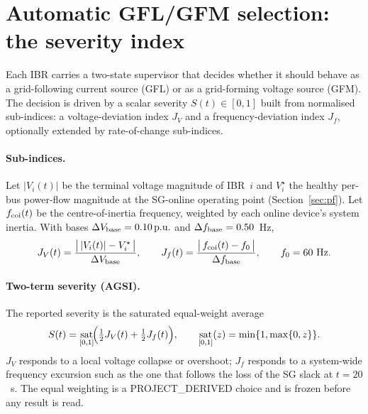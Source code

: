 \documentclass[12pt,a4paper]{article}
\DeclareMathOperator{\sat}{sat}
\newcommand{\pu}{\ifmmode\,\mathrm{p.u.}\else\ p.u.\fi}
\begin{document}
\section{Automatic GFL/GFM selection: the severity index}\label{sec:sev}

Each IBR carries a two-state supervisor that decides whether it should behave
as a grid-following current source (GFL) or as a grid-forming voltage source
(GFM).  The decision is driven by a scalar severity $S(t)\in[0,1]$ built from
normalised sub-indices: a voltage-deviation index $J_V$ and a
frequency-deviation index $J_f$, optionally extended by rate-of-change
sub-indices.

\paragraph{Sub-indices.}
Let $|V_i(t)|$ be the terminal voltage magnitude of IBR~$i$ and $V_i^{\star}$
the healthy per-bus power-flow magnitude at the SG-online operating point
(Section~\ref{sec:pf}).  Let $f_{\rm coi}(t)$ be the centre-of-inertia
frequency, weighted by each online device's system inertia.  With bases
$\Delta V_{\rm base}=0.10\pu$ and $\Delta f_{\rm base}=0.50$~Hz,
\begin{equation}
  J_V(t)=\frac{\bigl|\,|V_i(t)|-V_i^{\star}\,\bigr|}{\Delta V_{\rm base}},
  \qquad
  J_f(t)=\frac{\bigl|\,f_{\rm coi}(t)-f_0\,\bigr|}{\Delta f_{\rm base}},
  \qquad f_0=60~\mathrm{Hz}.
  \label{eq:jvjf}
\end{equation}

\paragraph{Two-term severity (AGSI).}
The reported severity is the saturated equal-weight average
\begin{equation}
  S(t)=\sat_{[0,1]}\!\Bigl(\tfrac12 J_V(t)+\tfrac12 J_f(t)\Bigr),
  \qquad
  \sat_{[0,1]}(z)=\min\{1,\max\{0,z\}\}.
  \label{eq:agsi}
\end{equation}
$J_V$ responds to a local voltage collapse or overshoot; $J_f$ responds to a
system-wide frequency excursion such as the one that follows the loss of the
SG slack at $t=20$~s.  The equal weighting is a \textsf{PROJECT\_DERIVED}
choice and is frozen before any result is read.
\end{document}
